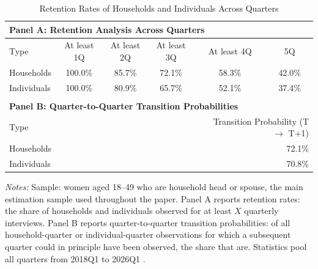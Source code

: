 \begin{table}[H]
\centering
\caption{Retention Rates of Households and Individuals Across Quarters}
\label{tab:panel_retention}
\small
\begin{tabular}{lccccc}
\multicolumn{6}{l}{\textbf{Panel A: Retention Analysis Across Quarters}} \\
\toprule
Type & At least 1Q & At least 2Q & At least 3Q & At least 4Q & 5Q \\
\midrule
Households & 100.0\% & 85.7\% & 72.1\% & 58.3\% & 42.0\% \\
Individuals & 100.0\% & 80.9\% & 65.7\% & 52.1\% & 37.4\% \\
\bottomrule
\\
\multicolumn{6}{l}{\textbf{Panel B: Quarter-to-Quarter Transition Probabilities}} \\
\toprule
\multicolumn{4}{l}{Type} & \multicolumn{2}{r}{Transition Probability (T $\to$ T+1)} \\
\midrule
\multicolumn{4}{l}{Households} & \multicolumn{2}{r}{72.1\%} \\
\multicolumn{4}{l}{Individuals} & \multicolumn{2}{r}{70.8\%} \\
\bottomrule
\end{tabular}
\par\vspace{3pt}\footnotesize\raggedright \textit{Notes:} Sample: women aged 18--49 who are household head or spouse, the main estimation sample used throughout the paper. Panel A reports retention rates: the share of households and individuals observed for at least $X$ quarterly interviews. Panel B reports quarter-to-quarter transition probabilities: of all household-quarter or individual-quarter observations for which a subsequent quarter could in principle have been observed, the share that are. Statistics pool all quarters from 
2018Q1 to 2026Q1
.
\end{table}
